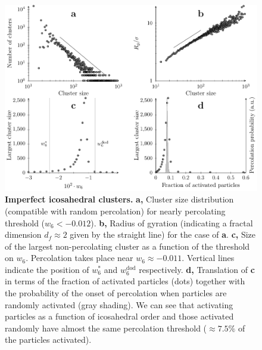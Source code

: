 \begin{figure}
\begin{center}
\includegraphics{fig_percolation.pdf}
\end{center}
	\caption{\textbf{Imperfect icosahedral clusters.} \textbf{a,} Cluster size distribution (compatible with random percolation) for nearly percolating threshold ($w_6<-0.012$). 
\textbf{b,} Radius of gyration (indicating a fractal dimension $d_f\approx 2$ given by the straight line) for the case of {\bf a}. \textbf{c,} Size of the largest non-percolating cluster as a function of the threshold on $w_6$. Percolation takes place near $w_6\approx -0.011$. Vertical lines indicate the position of $w_6^*$ and $w_6^\text{dod}$ respectively. \textbf{d,} Translation of \textbf{c} in terms of the fraction of activated particles (dots) together with the probability of the onset of percolation when particles are randomly activated (gray shading). We can see that activating particles as a function of icosahedral order and those activated randomly have almost the same percolation threshold ($\approx7.5\%$ of the particles activated).}
	\label{fig:percolation}
\end{figure}


